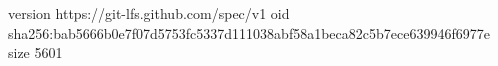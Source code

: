 version https://git-lfs.github.com/spec/v1
oid sha256:bab5666b0e7f07d5753fc5337d111038abf58a1beca82c5b7ece639946f6977e
size 5601
